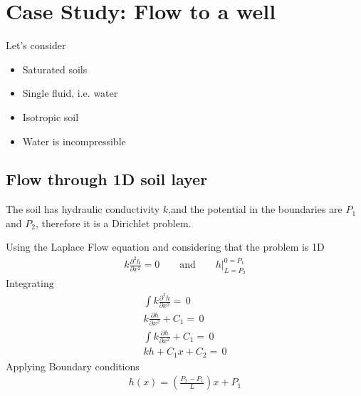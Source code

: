 \documentclass[a4paper, 11pt,article,oneside]{memoir}%
\begin{document}
\section{Case Study: Flow to a well}
Let's consider
\begin{itemize}
\item Saturated soils
\item Single fluid, i.e. water
\item Isotropic soil
\item Water is incompressible
\end{itemize}




\subsection{Flow through 1D soil layer}


The soil has hydraulic conductivity $k$,and the potential in the boundaries are $P_1$ and $P_2$, therefore it is a Dirichlet problem.

Using the Laplace Flow equation and considering that the problem is 1D
\begin{align*}
k\frac{\partial^2 h}{\partial x^2}=0\qquad \text{and}\qquad h|^{0=P_1}_{L=P_2}
\end{align*}
Integrating
\begin{gather*}
\int k\frac{\partial^2 h}{\partial x^2}=\,0\\
k\frac{\partial h}{\partial x^2}+C_1=\,0\\
\int k\frac{\partial h}{\partial x^2}+C_1=\,0\\ 
kh+C_1x+C_2=\,0
\end{gather*}
Applying Boundary conditions
\begin{align*}
h(x)=\left(\frac{P_2-P_1}{L}\right)x+P_1
\end{align*}
\end{document}
